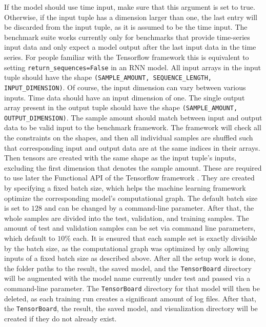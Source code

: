 \documentclass[draft,final]{vutinfth} %
\begin{document}
    If the model should use time input, make sure that this argument is set to true.
    Otherwise, if the input tuple has a dimension larger than one, the last entry will be discarded from the input tuple, as it is assumed to be the time input.
    The benchmark suite works currently only for benchmarks that provide time-series input data and only expect a model output after the last input data in the time series.
    For people familiar with the Tensorflow framework \cite{Tensorflow} this is equivalent to setting \texttt{return\_sequences=False} in an RNN model.
    All input arrays in the input tuple should have the shape \texttt{(SAMPLE\_AMOUNT, SEQUENCE\_LENGTH, INPUT\_DIMENSION)}.
    Of course, the input dimension can vary between various inputs. Time data should have an input dimension of one.
    The single output array present in the output tuple should have the shape \texttt{(SAMPLE\_AMOUNT, OUTPUT\_DIMENSION)}.
    The sample amount should match between input and output data to be valid input to the benchmark framework.
    The framework will check all the constraints on the shapes, and then all individual samples are shuffled such that corresponding input and output data are at the same indices in their arrays.
    Then tensors are created with the same shape as the input tuple's inputs, excluding the first dimension that denotes the sample amount.
    These are required to use later the Functional API of the Tensorflow framework \cite{Tensorflow}.
    They are created by specifying a fixed batch size, which helps the machine learning framework optimize the corresponding model's computational graph.
    The default batch size is set to $128$ and can be changed by a command-line parameter.
    After that, the whole samples are divided into the test, validation, and training samples. The amount of test and validation samples can be set via command line parameters, which default to $10\%$ each.
    It is ensured that each sample set is exactly divisible by the batch size, as the computational graph was optimized by only allowing inputs of a fixed batch size as described above.
    After all the setup work is done, the folder paths to the result, the saved model, and the \texttt{TensorBoard} directory will be augmented with the model name currently under test and passed via a command-line parameter.
    The \texttt{TensorBoard} directory for that model will then be deleted, as each training run creates a significant amount of log files.
    After that, the \texttt{TensorBoard}, the result, the saved model, and visualization directory will be created if they do not already exist.
\end{document}
